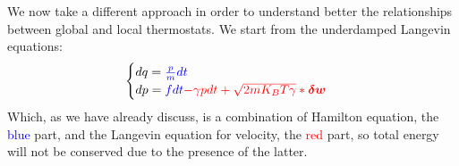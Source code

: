 
We now take a different approach in order to understand better  the relationships between global and local thermostats. We start from the underdamped Langevin equations:
\begin{equation}\label{underdamped Langevin}
    \begin{cases}
    dq = \color{blue}{\frac{p}{m}dt}\\
    dp = \color{blue}{f dt} \color{red}{-\gamma p dt + \sqrt{2mK_BT\gamma}* \boldsymbol{\delta w}}
    \end{cases}
\end{equation}
Which, as we have already discuss, is a combination of Hamilton equation, the \textcolor{blue}{blue} part, and the Langevin equation for velocity, the \textcolor{red}{red} part, so total energy will not be conserved due to the presence of the latter.

